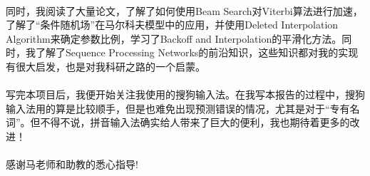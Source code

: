 \documentclass[UTF8, onecolumn, a4paper]{article}
\begin{document}
\paragraph*{}
同时，我阅读了大量论文，了解了如何使用Beam Search对Viterbi算法进行加速，了解了“条件随机场”在马尔科夫模型中的应用，并使用Deleted Interpolation Algorithm来确定参数比例，学习了Backoff and Interpolation的平滑化方法。同时，我了解了Sequence Processing Networks的前沿知识，这些知识都对我的实现有很大启发，也是对我科研之路的一个启蒙。
\paragraph*{}
写完本项目后，我便开始关注我使用的搜狗输入法。在我写本报告的过程中，搜狗输入法用的算是比较顺手，但是也难免出现预测错误的情况，尤其是对于“专有名词”。但不得不说，拼音输入法确实给人带来了巨大的便利，我也期待着更多的改进！
\paragraph*{}
感谢马老师和助教的悉心指导!
\end{document}
